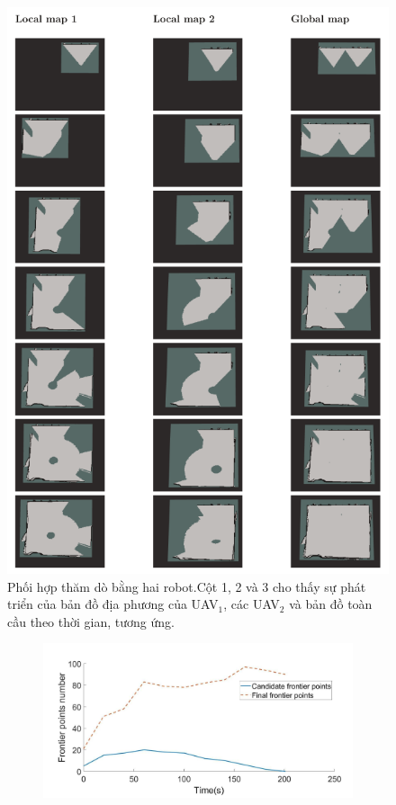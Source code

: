 \documentclass[11pt,openany]{book}
\begin{document}
\begin{algorimth}[H]
\begin{figure}[H]
    \includegraphics[tỉ lệ=0.5]{assets/3_14.png}
    \caption{Phối hợp thăm dò bằng hai robot.Cột 1, 2 và 3 cho thấy sự phát triển của bản đồ địa phương của UAV$_1$, các UAV$_2$ và bản đồ toàn cầu theo thời gian, tương ứng.}
    \label{fig:3.14}
\end{figure}
\begin{figure}[H]
    \centering
    \begin{subfigure}[H]{0.7\linewidth}
        \includegraphics[chiều rộng=\linewidth]{assets/3_15_a.png}

\end{subfigure}
\end{figure}
\end{algorimth}
\end{document}
